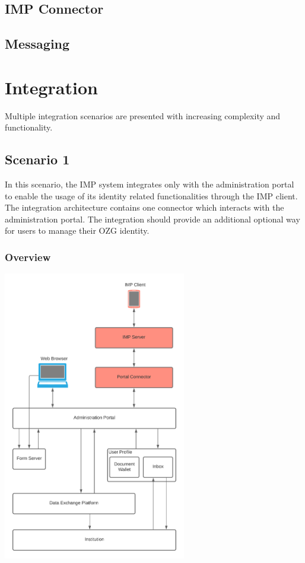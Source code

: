 \documentclass[
     12pt,         %
     a4paper,      %
     BCOR=10mm,version=first,     %
     DIV=14,version=first,        %
     ]{scrreprt}
\begin{document}
\subsection{IMP Connector}

\subsection{Messaging}

\section{Integration}

Multiple integration scenarios are presented with increasing complexity and functionality.

\subsection{Scenario 1}

In this scenario, the IMP system integrates only with the administration portal to enable the usage of its identity related functionalities through the IMP client. The integration architecture contains one connector which interacts with the administration portal. The integration should provide an additional optional way for users to manage their OZG identity.

\subsubsection{Overview}

\begin{center}
    \includegraphics[width=8cm]{Diagrams/Integration 1/Overview.png}
\end{center}
\end{document}
